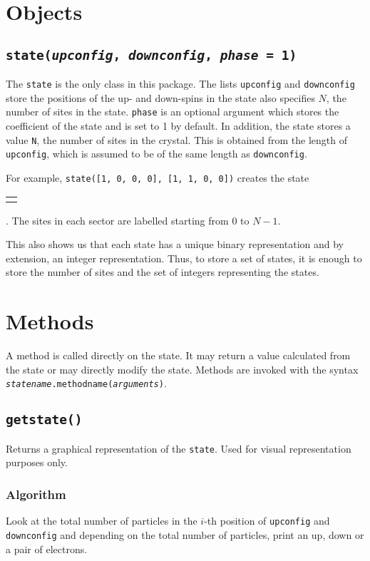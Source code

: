 \documentclass[]{book}
\newcommand{\dwn}{\fbox{$\mathord\downarrow\phantom{\uparrow}$}}%
\newcommand{\updwn}{\fbox{$\uparrow\downarrow$}}%
\newcommand{\emp}{\fbox{$\phantom{\downarrow}\phantom{\downarrow}$}}%
\newcommand{\electron}[2]{{%
		\setlength\tabcolsep{0pt}%
		\begin{tabular}{c}
			\fboxsep=0pt\fbox{\fboxsep=3pt#2}\\[2pt]
			#1
		\end{tabular}%
}}
\begin{document}
\section{Objects}
\subsection{\texttt{state(\textit{upconfig}, \textit{downconfig}, \textit{phase} = 1)}}
The \texttt{state} is the only class in this package. The lists \texttt{upconfig} and \texttt{downconfig} store the positions of the up- and down-spins in the state also specifies $N$, the number of sites in the state. \texttt{phase} is an optional argument which stores the coefficient of the state and is set to 1 by default. In addition, the state stores a value \texttt{N}, the number of sites in the crystal. This is obtained from the length of \texttt{upconfig}, which is assumed to be of the same length as \texttt{downconfig}.

For example, \texttt{state([1, 0, 0, 0], [1, 1, 0, 0])} creates the state \electron{}{\updwn\dwn\emp\emp}. The sites in each sector are labelled starting from $0$ to $N-1$.

This also shows us that each state has a unique binary representation and by extension, an integer representation. Thus, to store a set of states, it is enough to store the number of sites and the set of integers representing the states.

\section{Methods}
A method is called directly on the state. It may return a value calculated from the state or may directly modify the state. Methods are invoked with the syntax \texttt{\textit{statename}.methodname(\textit{arguments})}.

\subsection{\texttt{getstate()}}
Returns a graphical representation of the \texttt{state}. Used for visual representation purposes only.
\subsubsection*{Algorithm}
Look at the total number of particles in the $i$-th position of \texttt{upconfig} and \texttt{downconfig} and depending on the total number of particles, print an up, down or a pair of electrons.
\end{document}
